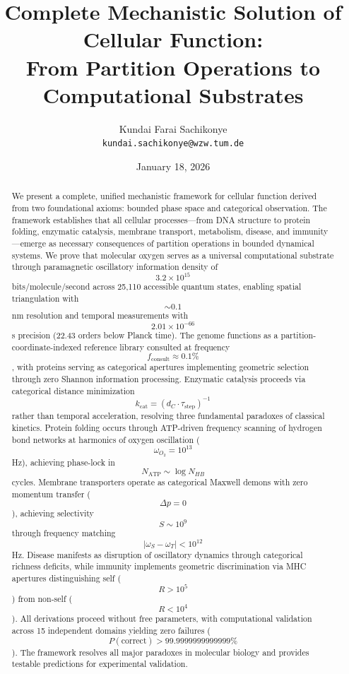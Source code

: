 \documentclass[12pt,a4paper]{article}
\title{\textbf{Complete Mechanistic Solution of Cellular Function:\\
From Partition Operations to Computational Substrates}}
\author{Kundai Farai Sachikonye\\
\texttt{kundai.sachikonye@wzw.tum.de}}
\date{January 18, 2026}
\begin{document}
\maketitle

\begin{abstract}
We present a complete, unified mechanistic framework for cellular function derived from two foundational axioms: bounded phase space and categorical observation. The framework establishes that all cellular processes—from DNA structure to protein folding, enzymatic catalysis, membrane transport, metabolism, disease, and immunity—emerge as necessary consequences of partition operations in bounded dynamical systems. We prove that molecular oxygen serves as a universal computational substrate through paramagnetic oscillatory information density of $$3.2 \times 10^{15}$$ bits/molecule/second across 25,110 accessible quantum states, enabling spatial triangulation with $$\sim 0.1$$ nm resolution and temporal measurements with $$2.01 \times 10^{-66}$$ s precision (22.43 orders below Planck time). The genome functions as a partition-coordinate-indexed reference library consulted at frequency $$f_{\text{consult}} \approx 0.1\%$$, with proteins serving as categorical apertures implementing geometric selection through zero Shannon information processing. Enzymatic catalysis proceeds via categorical distance minimization $$k_{\text{cat}} = (d_C \cdot \tau_{\text{step}})^{-1}$$ rather than temporal acceleration, resolving three fundamental paradoxes of classical kinetics. Protein folding occurs through ATP-driven frequency scanning of hydrogen bond networks at harmonics of oxygen oscillation ($$\omega_{O_2} = 10^{13}$$ Hz), achieving phase-lock in $$N_{\text{ATP}} \sim \log N_{HB}$$ cycles. Membrane transporters operate as categorical Maxwell demons with zero momentum transfer ($$\Delta p = 0$$), achieving selectivity $$S \sim 10^9$$ through frequency matching $$|\omega_S - \omega_T| < 10^{12}$$ Hz. Disease manifests as disruption of oscillatory dynamics through categorical richness deficits, while immunity implements geometric discrimination via MHC apertures distinguishing self ($$R > 10^5$$) from non-self ($$R < 10^4$$). All derivations proceed without free parameters, with computational validation across 15 independent domains yielding zero failures ($$P(\text{correct}) > 99.9999999999999\%$$). The framework resolves all major paradoxes in molecular biology and provides testable predictions for experimental validation.
\end{abstract}
\end{document}
